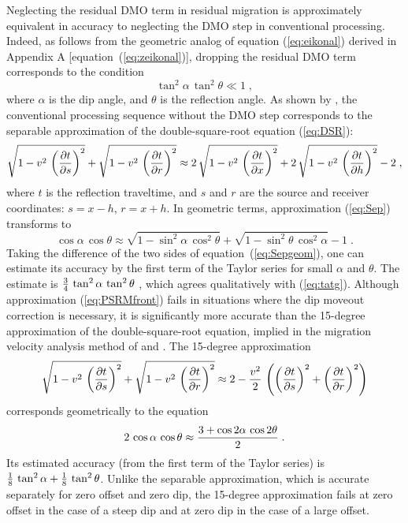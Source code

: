 Neglecting the residual DMO term in residual migration is
approximately equivalent in accuracy to neglecting the DMO step in
conventional processing. Indeed, as follows from the geometric analog
of equation (\ref{eq:eikonal}) derived in Appendix A
[equation~(\ref{eq:zeikonal})], dropping the residual
DMO term corresponds to the condition
 \begin{equation}
\tan^2{\alpha}\,\tan^2{\theta} \ll 1\;,
\label{eq:tatg}
\end{equation}
where $\alpha$ is the dip angle, and $\theta$ is the reflection angle.
As shown by \cite{GEO45-12-17531779}, the conventional processing
sequence without the DMO step corresponds to the separable
approximation of the double-square-root equation (\ref{eq:DSR}):
\begin{equation}
\sqrt{1 -  v^2\,\left({{\partial t} \over {\partial s}}\right)^2} +
\sqrt{1 -  v^2\,\left({{\partial t} \over {\partial r}}\right)^2}
\approx
2\,\sqrt{1 -  v^2\,\left({{\partial t} \over {\partial x}}\right)^2} +
2\,\sqrt{1 -  v^2\,\left({{\partial t} \over {\partial h}}\right)^2} -
2\;,
\label{eq:Sep}
\end{equation}
where $t$ is the reflection traveltime, and $s$ and $r$ are the source and
receiver coordinates: $s=x-h$, $r=x+h$.
In geometric terms, approximation (\ref{eq:Sep}) transforms to
\begin{equation}
\cos{\alpha}\,\cos{\theta}
\approx
\sqrt{1 -  \sin^2{\alpha}\,\cos^2{\theta}} +
\sqrt{1 -  \sin^2{\theta}\,\cos^2{\alpha}} - 1\;.
\label{eq:Sepgeom}
\end{equation}
Taking the difference of the two sides of
equation~(\ref{eq:Sepgeom}), one can estimate its accuracy by the
first term of the Taylor series for small $\alpha$ and $\theta$. The
estimate is ${3 \over 4}\,\tan^2{\alpha}\,\tan^2{\theta}$
\cite[]{GEO45-12-17531779}, which agrees qualitatively with
(\ref{eq:tatg}). Although approximation (\ref{eq:PSRMfront}) fails in situations
where the dip moveout correction is necessary, it is significantly
more accurate than the 15-degree approximation of the
double-square-root equation, implied in the migration velocity
analysis method of \cite{GEO49-10-16641674} and \cite{abma}.  The
15-degree approximation
\begin{equation}
\sqrt{1 -  v^2\,\left({{\partial t} \over {\partial s}}\right)^2} +
\sqrt{1 -  v^2\,\left({{\partial t} \over {\partial r}}\right)^2}
\approx
2 - {v^2 \over 2}\,
\left(  \left({{\partial t} \over {\partial s}}\right)^2 +
        \left({{\partial t} \over {\partial r}}\right)^2\right)
\label{eq:FDeg}
\end{equation}
corresponds geometrically to the equation 
\begin{equation}
2\,\cos{\alpha}\,\cos{\theta}
\approx
{{3 + \cos{2\alpha}\,\cos{2\theta}} \over 2}\;.
\label{eq:FDgeom}
\end{equation} 
Its estimated accuracy (from the first term of the Taylor series)
is ${1 \over 8}\,\tan^2{\alpha} + {1 \over
8}\,\tan^2{\theta}$.  Unlike the separable approximation, which is
accurate separately for zero offset and zero dip, the 15-degree
approximation fails at zero offset in the case of a steep dip and at zero
dip in the case of a large offset.

